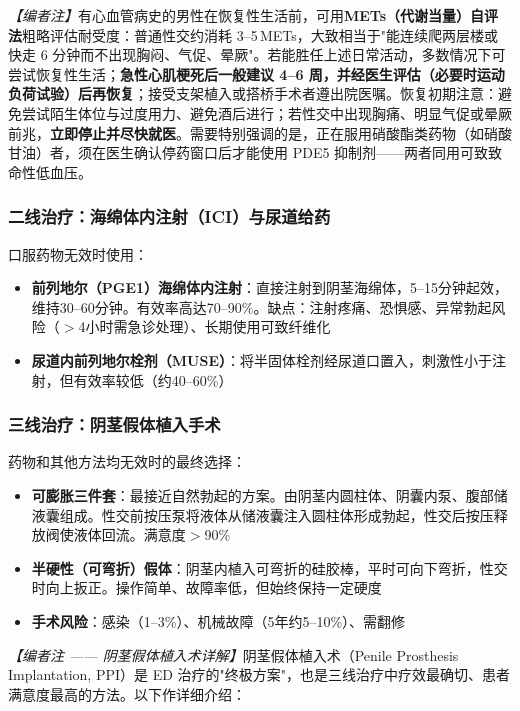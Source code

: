 \noindent\textit{【编者注】}有心血管病史的男性在恢复性生活前，可用\textbf{METs（代谢当量）自评法}粗略评估耐受度：普通性交约消耗 3--5\,METs，大致相当于"能连续爬两层楼或快走 6 分钟而不出现胸闷、气促、晕厥"。若能胜任上述日常活动，多数情况下可尝试恢复性生活；\textbf{急性心肌梗死后一般建议 4--6 周，并经医生评估（必要时运动负荷试验）后再恢复}；接受支架植入或搭桥手术者遵出院医嘱。恢复初期注意：避免尝试陌生体位与过度用力、避免酒后进行；若性交中出现胸痛、明显气促或晕厥前兆，\textbf{立即停止并尽快就医}。需要特别强调的是，正在服用硝酸酯类药物（如硝酸甘油）者，须在医生确认停药窗口后才能使用 PDE5 抑制剂——两者同用可致致命性低血压。

\subsubsection{二线治疗：海绵体内注射（ICI）与尿道给药}

口服药物无效时使用：
\begin{itemize}[leftmargin=2cm]
	\item \textbf{前列地尔（PGE1）海绵体内注射}：直接注射到阴茎海绵体，5--15分钟起效，维持30--60分钟。有效率高达70--90\%。缺点：注射疼痛、恐惧感、异常勃起风险（$>$4小时需急诊处理）、长期使用可致纤维化
	\item \textbf{尿道内前列地尔栓剂（MUSE）}：将半固体栓剂经尿道口置入，刺激性小于注射，但有效率较低（约40--60\%）
\end{itemize}

\subsubsection{三线治疗：阴茎假体植入手术}
\label{subsec:penile_prosthesis}

药物和其他方法均无效时的最终选择：
\begin{itemize}[leftmargin=2cm]
	\item \textbf{可膨胀三件套}：最接近自然勃起的方案。由阴茎内圆柱体、阴囊内泵、腹部储液囊组成。性交前按压泵将液体从储液囊注入圆柱体形成勃起，性交后按压释放阀使液体回流。满意度$>$90\%
	\item \textbf{半硬性（可弯折）假体}：阴茎内植入可弯折的硅胶棒，平时可向下弯折，性交时向上扳正。操作简单、故障率低，但始终保持一定硬度
	\item \textbf{手术风险}：感染（1--3\%）、机械故障（5年约5--10\%）、需翻修
\end{itemize}

\noindent\textit{【编者注 —— 阴茎假体植入术详解】}阴茎假体植入术（Penile Prosthesis Implantation, PPI）是 ED 治疗的"终极方案"，也是三线治疗中疗效最确切、患者满意度最高的方法。以下作详细介绍：

